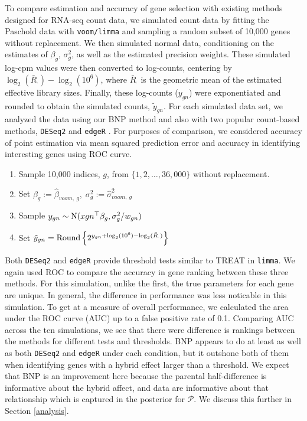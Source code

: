 To compare estimation and accuracy of gene selection with existing methods designed for RNA-seq count data, we simulated count data by fitting the Paschold data with \texttt{voom/limma} and sampling a random subset of 10,000 genes without replacement. We then simulated normal data, conditioning on the estimates of $\beta_g$, $\sigma^2_g$, as well as the estimated precision weights. These simulated log-cpm values were then converted to log-counts, centering by $\log_2(\bar{R}_\cdot)-\log_2(10^6)$, where $\bar{R}_\cdot$ is the geometric mean of the estimated effective library sizes. Finally, these log-counts ($y_{gn}$) were exponentiated and rounded to obtain the simulated counts, $\tilde{y}_{gn}$. For each simulated data set, we analyzed the data using our BNP method and also with two popular count-based methods, \texttt{DESeq2} and \texttt{edgeR} \citep{edger2010,deseq2014}. For purposes of comparison, we considered accuracy of point estimation via mean squared prediction error and accuracy in identifying interesting genes using ROC curve.
\begin{enumerate}
\item Sample 10,000 indices, $g$, from $\{1,2,\ldots,36,000\}$ without replacement.
\item Set $\beta_g:= \hat{\beta}_{voom,~g},\; \sigma^2_g:= \hat{\sigma}^2_{voom,~g}$
\item Sample $y_{gn} \sim \operatorname{N}(x{gn}^\top\beta_g, \sigma^2_g/w_{gn})$
\item Set $\tilde{y}_{gn} = \operatorname{Round} \left\{ 2^{y_{gn} + \log_2(10^6) - \log_2(\bar{R}_{\cdot})} \right\}$
\end{enumerate}


Both \texttt{DESeq2} and \texttt{edgeR} provide threshold tests similar to TREAT in \texttt{limma}. We again used ROC to compare the accuracy in gene ranking between these three methods. For this simulation, unlike the first, the true parameters for each gene are unique. In general, the difference in performance was less noticable in this simulation. To get at a measure of overall performance, we calculated the area under the ROC curve (AUC) up to a false positive rate of 0.1. Comparing AUC across the ten simulations, we see that there were difference is rankings between the methods for different tests and thresholds. BNP appears to do at least as well as both \texttt{DESeq2} and \texttt{edgeR} under each condition, but it outshone both of them when identifying genes with a hybrid effect larger than a threshold. We expect that BNP is an improvement here because the parental half-difference is informative about the hybrid affect, and data are informative about that relationship which is captured in the posterior for $\mathcal{P}$. We discuss this further in Section \ref{analysis}.

